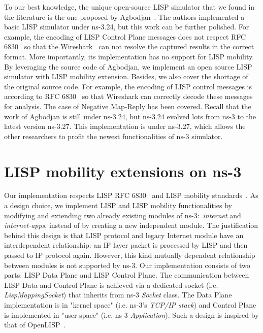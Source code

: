 To our best knowledge, the unique open-source LISP simulator that we found in the literature is the one proposed by Agbodjan~\cite{lionel2016}. The authors implemented a basic LISP simulator under ns-3.24, but this work can be further polished. For example, the encoding of LISP Control Plane messages does not respect RFC 6830~\cite{rfc6830} so that the Wireshark~\cite{wireshark} can not resolve the captured results in the correct format. %
More importantly, its implementation has no support for LISP mobility. %
By leveraging the source code of Agbodjan, we implement an open source LISP simulator with LISP mobility extension. Besides, we also cover the shortage of the original source code. For example, the encoding of LISP control messages is according to RFC 6830~\cite{rfc6830} so that Wireshark can correctly decode these messages for analysis. The case of Negative Map-Reply has been covered. Recall that the work of Agbodjan is still under ns-3.24, but ns-3.24 evolved lots from ns-3 to the latest version ns-3.27. This implementation is under ns-3.27, which allows the other researchers to profit the newest functionalities of ns-3 simulator.

 
\section{ LISP mobility extensions on ns-3}
\label{sec:ns3_lispmn}
Our implementation respects LISP RFC 6830~\cite{rfc6830} and LISP mobility standards~\cite{meyer2016lisp}. As a design choice, we implement LISP and LISP mobility functionalities by modifying and extending two already existing modules of ns-3:~\emph{internet} and \emph{internet-apps}, instead of by creating a new independent module. The justification behind this design is that LISP protocol and legacy Internet module have an interdependent relationship: an IP layer packet is processed by LISP and then passed to IP protocol again. However, this kind mutually dependent relationship between modules is not supported by ns-3. Our implementation consists of two parts: LISP Data Plane and LISP Control Plane. The communication between LISP Data and Control Plane is achieved via a dedicated socket (i.e. \emph{LispMappingSocket}) that inherits from ns-3 \emph{Socket} class. The Data Plane implementation is in "kernel space" (i.e. ns-3's \emph{TCP/IP stack}) and Control Plane is implemented in "user space" (i.e. ns-3 \emph{Application}). Such a design is inspired by that of OpenLISP~\cite{saucez2009openlisp}.  

